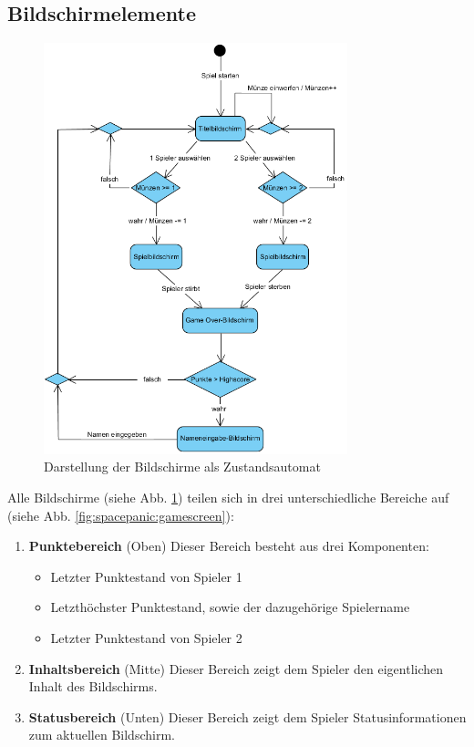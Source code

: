 \documentclass[12pt]{article}
\begin{document}
\subsection{Bildschirmelemente}
      \begin{figure}[ht!]
          \centering
          \includegraphics[width=250pt]{images/state_machine}
          \caption{Darstellung der Bildschirme als Zustandsautomat}
          \label{fig:spacepanic:statemachine}
      \end{figure}
Alle Bildschirme (siehe Abb. \ref{fig:spacepanic:statemachine}) teilen sich in drei unterschiedliche Bereiche auf (siehe Abb. \ref{fig:spacepanic:gamescreen}):
\begin{enumerate}
	\item \textbf{Punktebereich} (Oben) \newline
  		Dieser Bereich besteht aus drei Komponenten:
        \begin{itemize}
            \item Letzter Punktestand von Spieler 1
            \item Letzthöchster Punktestand, sowie der dazugehörige Spielername
            \item Letzter Punktestand von Spieler 2
        \end{itemize}
	\item \textbf{Inhaltsbereich} (Mitte) \newline
		Dieser Bereich zeigt dem Spieler den eigentlichen Inhalt des Bildschirms. 
	\item \textbf{Statusbereich} (Unten) \newline
		Dieser Bereich zeigt dem Spieler Statusinformationen zum aktuellen Bildschirm.
\end{enumerate}
\end{document}
